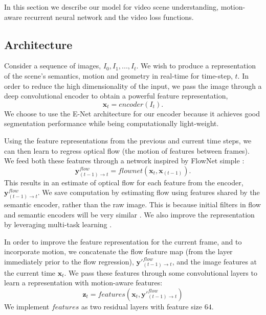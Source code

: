 In this section we describe our model for video scene understanding, motion-aware recurrent neural network and the video loss functions.

\subsection{Architecture}

Consider a sequence of images, $I_0, I_1, ... , I_t$. We wish to produce a representation of the scene's semantics, motion and geometry in real-time for time-step, $t$.
In order to reduce the high dimensionality of the input, we pass the image through a deep convolutional encoder to obtain a powerful feature representation,
\begin{equation}
\mathbf{x}_t = encoder(I_t).
\end{equation}
We choose to use the E-Net architecture for our encoder \cite{paszke2016enet} because it achieves good segmentation performance while being computationally light-weight.

Using the feature representations from the previous and current time steps, we can then learn to regress optical flow (the motion of features between frames). We feed both these features through a network inspired by FlowNet simple \cite{flownet}:
\begin{equation}
\mathbf{y}^{flow}_{(t-1) \to t} = flownet(\mathbf{x}_t, \mathbf{x}_{(t-1)}).
\end{equation}
This results in an estimate of optical flow for each feature from the encoder, $\mathbf{y}^{flow}_{(t-1) \to t} $. We save computation by estimating flow using features shared by the semantic encoder, rather than the raw image. This is because initial filters in flow and semantic encoders will be very similar \cite{zeiler2014visualizing}. We also improve the representation by leveraging multi-task learning \cite{caruana1998multitask}.

In order to improve the feature representation for the current frame, and to incorporate motion, we concatenate the flow feature map (from the layer immediately prior to the flow regression), $\mathbf{y}'^{flow}_{(t-1) \to t}$, and the image features at the current time $\mathbf{x}_t$. We pass these features through some convolutional layers to learn a representation with motion-aware features:
\begin{equation}
\mathbf{z}_t = features(\mathbf{x}_t, \mathbf{y}'^{flow}_{(t-1) \to t})
\end{equation}
We implement $features$ as two residual layers \cite{he2016deep} with feature size $64$.

